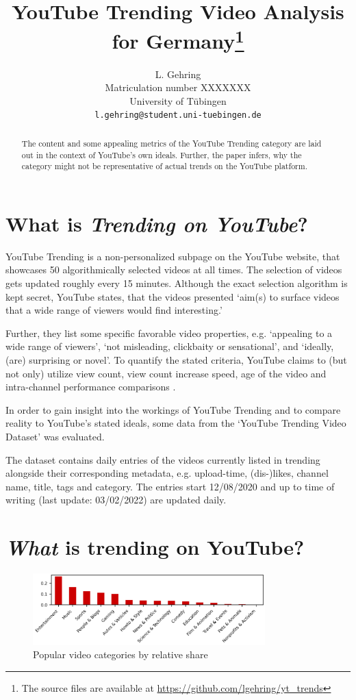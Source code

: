 \documentclass{article}
\title{YouTube Trending Video Analysis\\
for Germany\thanks{The source files are available at \url{https://github.com/lgehring/yt_trends}}}
\author{%
  L. Gehring \\
  Matriculation number XXXXXXX\\
  University of Tübingen\\
  \texttt{l.gehring@student.uni-tuebingen.de} \\
}
\begin{document}
\maketitle

\begin{abstract}
  The content and some appealing metrics of the YouTube Trending category are laid out
  in the context of YouTube's own ideals. Further, the paper infers, 
  why the category might not be representative of actual trends on the YouTube platform.
\end{abstract}

\section{What is \textit{Trending on YouTube}?}
YouTube Trending is a non-personalized subpage on the YouTube website, that showcases 50 algorithmically selected videos at all times. The selection of videos gets updated roughly every 15 minutes. Although the exact selection algorithm is kept secret, YouTube states, that the videos presented `aim(s) to surface videos that a wide range of viewers would find interesting.'

Further, they list some specific favorable video properties, e.g. `appealing to a wide range of viewers', `not misleading, clickbaity or sensational', and `ideally, (are) surprising or novel'. To quantify the stated criteria, YouTube claims to (but not only) utilize view count, view count increase speed, age of the video and intra-channel performance comparisons \cite{trends_help}.

In order to gain insight into the workings of YouTube Trending and to compare reality to YouTube's stated ideals, some data from the `YouTube Trending Video Dataset' \cite{data} was evaluated.

The dataset contains daily entries of the videos currently listed in trending alongside their corresponding metadata, e.g. upload-time, (dis-)likes, channel name, title, tags and category. The entries start 12/08/2020 and up to time of writing (last update: 03/02/2022) are updated daily.

\section{\textit{What} is trending on YouTube?}
\begin{figure}[h]
    \centering
    \includegraphics[width=0.8\textwidth]{fig/pop_cat.png}
    \caption{Popular video categories by relative share}
    \label{fig:pop_cat}
\end{figure}
\end{document}
